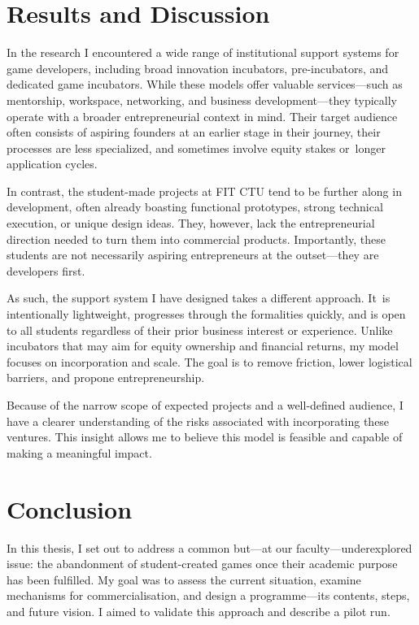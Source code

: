 \chapter*{Results and Discussion}
In the research I encountered a wide range of institutional support systems for game developers, including broad innovation incubators, pre-incubators, and dedicated game incubators. While these models offer valuable services—such as mentorship, workspace, networking, and business development—they typically operate with a broader entrepreneurial context in mind. Their target audience often consists of aspiring founders at an earlier stage in their journey, their processes are less specialized, and sometimes involve equity stakes or~longer application cycles.

In contrast, the student-made projects at FIT CTU tend to be further along in development, often already boasting functional prototypes, strong technical execution, or unique design ideas. They, however, lack the entrepreneurial direction needed to turn them into commercial products. Importantly, these students are not necessarily aspiring entrepreneurs at the outset—they are developers first.

As such, the support system I have designed takes a different approach. It~is intentionally lightweight, progresses through the formalities quickly, and is open to all students regardless of their prior business interest or experience. Unlike incubators that may aim for equity ownership and financial returns, my model focuses on incorporation and scale. The goal is to remove friction, lower logistical barriers, and propone entrepreneurship.

Because of the narrow scope of expected projects and a well-defined audience, I have a clearer understanding of the risks associated with incorporating these ventures. This insight allows me to believe this model is feasible and capable of making a meaningful impact.

\chapter*{Conclusion}
In this thesis, I set out to address a common but—at our faculty—underexplored issue: the abandonment of student-created games once their academic purpose has been fulfilled. My goal was to assess the current situation, examine mechanisms for commercialisation, and design a programme—its contents, steps, and future vision. I aimed to validate this approach and describe a pilot run.

